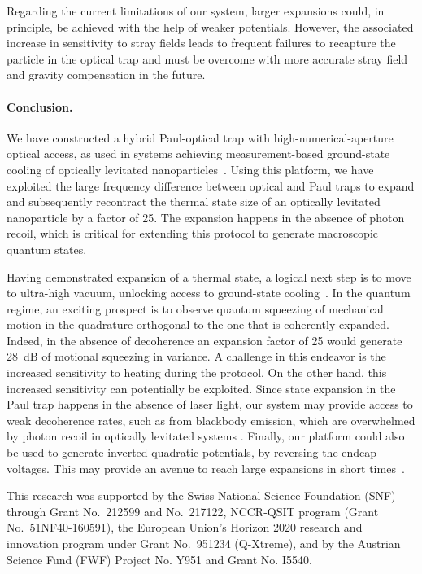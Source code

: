 Regarding the current limitations of our system,  larger expansions could, in principle, be achieved with the help of weaker potentials. 
However, the associated increase in sensitivity to stray fields leads to frequent failures to recapture the particle in the optical trap and must be overcome with more accurate stray field and gravity compensation in the future.


\paragraph* {Conclusion.}

We have constructed a hybrid Paul-optical trap with high-numerical-aperture optical access, as used in systems achieving measurement-based ground-state cooling of optically levitated nanoparticles~\cite{tebbenjohanns2021quantum,magrini2021realtime}. Using this platform, we have exploited the large frequency difference between optical and Paul traps to expand and subsequently recontract the thermal state size of an optically levitated nanoparticle by a factor of 25.
The expansion happens in the absence of photon recoil, which is critical for extending this protocol to generate macroscopic quantum states.

Having demonstrated expansion of a thermal state, a logical next step is to move to ultra-high vacuum, unlocking access to ground-state cooling~\cite{magrini2021realtime, tebbenjohanns2021quantum,kamba2022optical}.
In the quantum regime, an exciting prospect is to observe quantum squeezing of mechanical motion in the quadrature orthogonal to the one that is coherently expanded. Indeed, in the absence of decoherence an expansion factor of 25 would generate 28~dB of motional squeezing in variance.
A challenge in this endeavor is the increased sensitivity to heating during the protocol.
On the other hand, this increased sensitivity can potentially be exploited. Since state expansion in the Paul trap happens in the absence of laser light, our system may provide access to weak decoherence rates, such as from blackbody emission, which are overwhelmed by photon recoil in optically levitated systems \cite{romero-isart2011quantum,bateman2014nearfield,agrenius2023interaction}.
Finally, our platform could also be used to generate inverted quadratic potentials, by reversing the endcap voltages. This may provide an avenue to reach large expansions in short times~\cite{romero-isart2017coherent, weiss2021large,roda-llordes2023macroscopic}.

\begin{acknowledgments}
This research was supported by the Swiss National
Science Foundation (SNF) through Grant No.\ 212599 and No.\ 217122, NCCR-QSIT program (Grant No.\ 51NF40-160591), the European
Union’s Horizon 2020 research and innovation program
under Grant No.\ 951234 (Q-Xtreme), and by the Austrian Science Fund (FWF) Project No. Y951 and Grant No. I5540. 
\end{acknowledgments}


